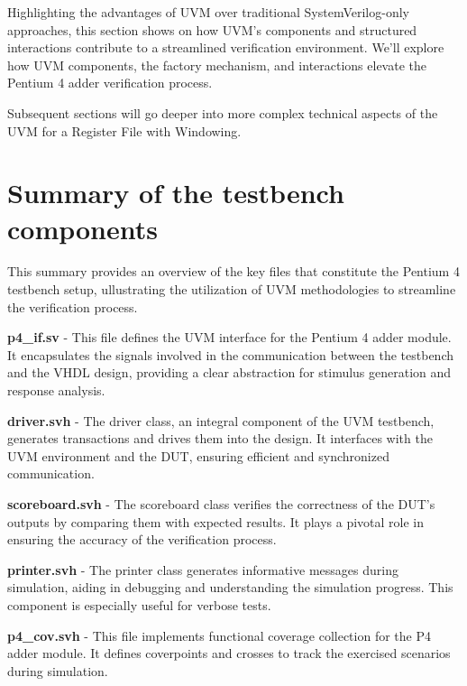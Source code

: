 \documentclass[12pt,a4paper]{report}
\begin{document}
Highlighting the advantages of UVM over traditional SystemVerilog-only approaches, this section shows on how UVM's components and structured interactions contribute to a streamlined verification environment. We'll explore how UVM components, the factory mechanism, and interactions elevate the Pentium 4 adder verification process.

Subsequent sections will go deeper into more complex technical aspects of the UVM for a Register File with Windowing.

\section{Summary of the testbench components}
This summary provides an overview of the key files that constitute the Pentium 4 testbench setup, ullustrating the utilization of UVM methodologies to streamline the verification process.

\vspace*{0.3cm}

\textbf{p4\_if.sv} - This file defines the UVM interface for the Pentium 4 adder module. It encapsulates the signals involved in the communication between the testbench and the VHDL design, providing a clear abstraction for stimulus generation and response analysis.

\vspace*{0.3cm}

\textbf{driver.svh }- The driver class, an integral component of the UVM testbench, generates transactions and drives them into the design. It interfaces with the UVM environment and the DUT, ensuring efficient and synchronized communication.

\vspace*{0.3cm}

\textbf{scoreboard.svh} - The scoreboard class verifies the correctness of the DUT's outputs by comparing them with expected results. It plays a pivotal role in ensuring the accuracy of the verification process.

\vspace*{0.3cm}

\textbf{printer.svh} - The printer class generates informative messages during simulation, aiding in debugging and understanding the simulation progress. This component is especially useful for verbose tests.

\vspace*{0.3cm}

\textbf{p4\_cov.svh} - This file implements functional coverage collection for the P4 adder module. It defines coverpoints and crosses to track the exercised scenarios during simulation.
\end{document}

